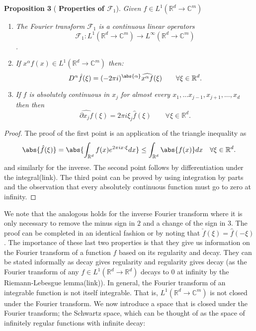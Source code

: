 \documentclass[
]{article}
\begin{document}
\leavevmode{}%
\textbf{Proposition 3} ( \textbf{Properties of \(\mathcal{F}_1\)}).
\emph{Given \(f\in L^1({\mathbb R}^d\to\mathbb{C}^m)\)}

\begin{enumerate}
\item
  \emph{The Fourier transform \(\mathcal{F}_1\) is a continuous linear
  operators
  \[\mathcal{F}_1:L^1({\mathbb R}^d\to\mathbb{C}^m) \to L^\infty({\mathbb R}^d\to\mathbb{C}^m)\].}
\item
  \emph{If \(x^\alpha f(x)\in L^1({\mathbb R}^d\to\mathbb{C}^m)\)
  then:\[D^\alpha \hat{f}(\xi)=(-2\pi i)^\abs{\alpha}\widehat{x^{\alpha} f}(\xi)\qquad\forall \xi\in{\mathbb R}^d.\]}
\item
  \emph{If \(f\) is absolutely continuous in \(x_j\) for almost every
  \(x_1,...x_{j-1},x_{j+1},...,x_d\) then then
  \[\widehat{\partial x_j f}(\xi)=2\pi i\xi_j\widehat{ f}(\xi)\qquad\forall \xi\in{\mathbb R}^d.\]}
\end{enumerate}

\emph{Proof.} The proof of the first point is an application of the
triangle inequality as
\[\abs{\hat{f}(\xi )}=\abs{\int_{{\mathbb R}^d}f(x)e^{2\pi i x\cdot \xi } dx}\leq\int_{{\mathbb R}^d}\abs{f(x)}dx\quad\forall \xi \in {\mathbb R}^d.\]
and similarly for the inverse. The second point follows by
differentiation under the integral(link). The third point can be proved
by using integration by parts and the observation that every absolutely
continuous function must go to zero at infinity.~◻

We note that the analogous holds for the inverse Fourier transform where
it is only necessary to remove the minus sign in \(2\) and a change of
the sign in \(3\). The proof can be completed in an identical fashion or
by noting that \(\check{f}(\xi )=\hat{f}(-\xi )\). The importance of
these last two properties is that they give us information on the
Fourier transform of a function \(f\) based on its regularity and decay.
They can be stated informally as decay gives regularity and regularity
gives decay (as the Fourier transform of any
\(f\in L^1({\mathbb R}^d\to{\mathbb R}^d)\) decays to 0 at infinity by
the Riemann-Lebesgue lemma(link)). In general, the Fourier transform of
an integrable function is not itself integrable. That is,
\(L^1({\mathbb R}^d\to\mathbb{C}^m)\) is not closed under the Fourier
transform. We now introduce a space that is closed under the Fourier
transform; the Schwartz space, which can be thought of as the space of
infinitely regular functions with infinite decay:
\end{document}
